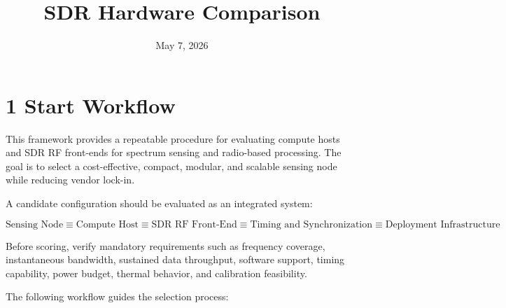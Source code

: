 \documentclass[11pt,a4paper]{article}
\title{SDR Hardware Comparison}
\date{May 7, 2026}
\begin{document}
\maketitle

\section*{1 Start Workflow}

This framework provides a repeatable procedure for evaluating compute hosts and SDR RF front-ends for spectrum sensing and radio-based processing. The goal is to select a cost-effective, compact, modular, and scalable sensing node while reducing vendor lock-in.

A candidate configuration should be evaluated as an integrated system:

\[
\text{Sensing Node} \equiv \text{Compute Host} \equiv \text{SDR RF Front-End} \equiv \text{Timing and Synchronization} \equiv \text{Deployment Infrastructure}
\]

Before scoring, verify mandatory requirements such as frequency coverage, instantaneous bandwidth, sustained data throughput, software support, timing capability, power budget, thermal behavior, and calibration feasibility.

The following workflow guides the selection process:
\end{document}
